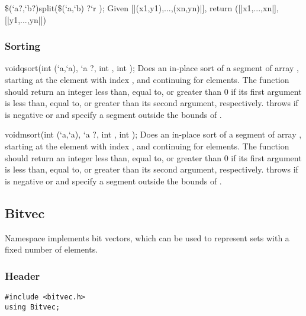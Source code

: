 \begin{defun2}{\$(`a?,`b?)}{split}{(\$(`a,`b) {?}`r );}
  Given [|(x1,y1),...,(xn,yn)|], return ([|x1,...,xn|],[|y1,...,yn|]) 
\end{defun2}

\subsubsection*{Sorting}

\begin{defun2}{void}{qsort}{(int (`a,`a), `a ?, int , int );}
  Does an in-place sort of a segment of array , starting at the
  element with index , and continuing for  elements.
  The function  should return an integer less than, equal
  to, or greater than 0 if its first argument is less than, equal to,
  or greater than its second argument, respectively.  
  throws  if  is
  negative or  and  specify a segment outside the
  bounds of .
\end{defun2}

\begin{defun2}{void}{msort}{(int (`a,`a), `a ?, int , int );}
  Does an in-place sort of a segment of array , starting at the
  element with index , and continuing for  elements.
  The function  should return an integer less than, equal
  to, or greater than 0 if its first argument is less than, equal to,
  or greater than its second argument, respectively.  
  throws  if  is
  negative or  and  specify a segment outside the
  bounds of .
\end{defun2}

\subsection{Bitvec}

Namespace  implements bit vectors, which can be used to
represent sets with a fixed number of elements.

\subsubsection*{Header}
\begin{verbatim}
#include <bitvec.h>
using Bitvec;
\end{verbatim}

